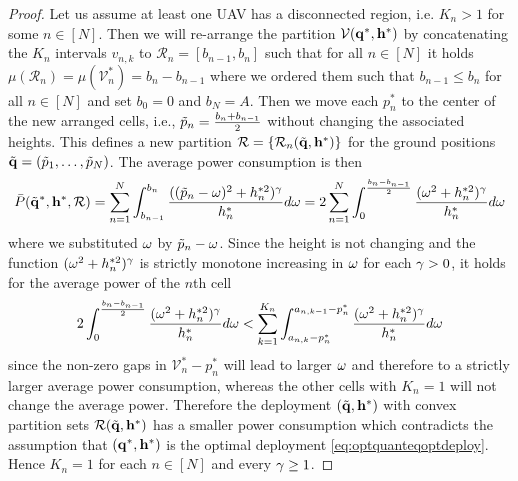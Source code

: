 \documentclass[smallabstract,smallcaptions]{dccpaper}
\renewcommand{\vp}{\mathbf q}
\newcommand{\Pbar}{\ensuremath{\bar{P}}}         %
\newcommand{\Vor}{\ensuremath{\mathcal{V}}}         %
\newcommand{\Rset}{\ensuremath{\mathcal R}}
\begin{document}
\begin{proof}
  Let us assume at least one UAV has a disconnected region, i.e. $K_n>1$ for some $n\in[N]$. Then we will re-arrange the
  partition $\Vor(\vp^*,\vh^*)$ by concatenating the $K_n$ intervals $v_{n,k}$ to $\Rset_n=[b_{n-1},b_{n}]$ such that for
  all $n\in[N]$ it holds $\mu(\Rset_n)=\mu(\Vor^*_n)=b_n-b_{n-1}$ where we ordered them such that $b_{n-1}\leq b_{n}$ for all $n\in[N]$
  and set $b_0=0$ and $b_N=A$. Then we move each $p_n^*$ to the center of the new arranged cells, i.e.,
  $\tilde{p}_n=\frac{b_n+b_{n-1}}{2}$ without changing the associated heights. This defines a new partition
  $\Rset=\{\Rset_n(\tvp,\vh^*)\}$ for the ground positions $\tvp=(\tp_1,\dots,\tp_N)$. The average power consumption is then
  \begin{align}
    \Pbar(\tvp^*,\vh^*,\Rset)=\sum_{n=1}^N \int_{b_{n-1}}^{b_n} \frac{ ((\tp_n-\ome)^2+h_n^{*2})^{\gam}}{h_n^{*}} d\ome
= 2\sum_{n=1}^N \int_{0}^{\frac{b_n-b_{n-1}}{2}} \frac{ (\ome^2+h_n^{*2})^{\gam}}{h_n^{*}} d\ome
  \end{align}
  where we substituted $\omega$ by $\tilde{p}_n-\omega$. Since the height is not changing and the function
  $(\omega^2+h_n^{*2})^{\gamma}$ is strictly monotone increasing in $\omega$ for each $\gamma>0$, it holds for the average power
  of the $n$th cell 
  \begin{align}
    2\int_{0}^{\frac{b_n-b_{n-1}}{2}} \frac{ (\omega^2+h_n^{*2})^{\gamma}}{h_n^{*}} d\omega 
    < \sum_{k=1}^{K_n}\int_{a_{n,k}-p_n^*}^{a_{n,k-1}-p_n^*} \frac{ (\omega^2+h_n^{*2})^{\gamma}}{h_n^{*}} d\omega
  \end{align}
  since the non-zero gaps in $\Vor_n^*-p_n^*$ will lead to larger $\omega$ and therefore to a strictly larger average
  power consumption, whereas the other cells with $K_n=1$ will not change the average power.  Therefore the deployment
  $(\tvp,\vh^*)$ with convex partition sets  $\Rset(\tvp,\vh^*)$ has a smaller power consumption which contradicts 
  the assumption that $(\vp^*,\vh^*)$ is the optimal deployment \eqref{eq:optquanteqoptdeploy}. Hence $K_n=1$ for each
  $n\in[N]$ and every $\gamma\geq 1$.


    







\end{proof}
\end{document}
